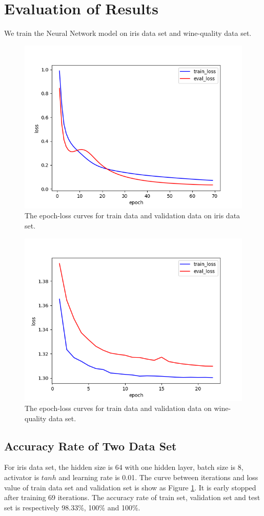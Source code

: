 \section{Evaluation of Results}\label{sec:evaluation}
We train the Neural Network model on iris data set and wine-quality data set. 

\begin{figure}[tbp]
	\centering
	\includegraphics[width = .5\textwidth]{images/iris_loss.png}
	\caption{The epoch-loss curves for train data and validation data on iris data set.}
	\label{fig:iris_loss}
\end{figure}

\begin{figure}[tbp]
	\centering
	\includegraphics[width = .5\textwidth]{images/wine_loss.png}
	\caption{The epoch-loss curves for train data and validation data on wine-quality data set.}
	\label{fig:wine_loss}
\end{figure}

\subsection{Accuracy Rate of Two Data Set}
For iris data set, the hidden size is 64 with one hidden layer, batch size is 8, activator is \(tanh\) and learning rate is 0.01. The curve between iterations and loss value of train data set and validation set is show as Figure \ref{fig:iris_loss}. It is early stopped after training 69 iterations. The accuracy rate of train set, validation set and test set is respectively 98.33\%, 100\% and 100\%.


